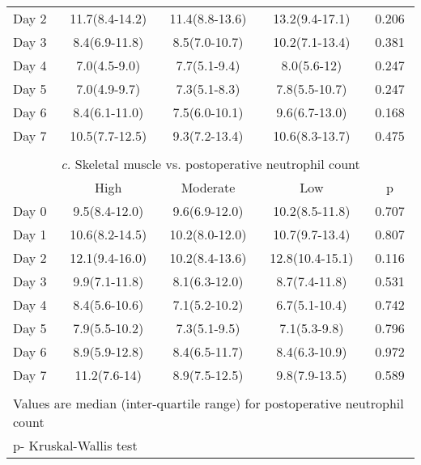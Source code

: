 \begin{table}[p]
\begin{tabular}{|l c c c c |}
		Day 2 & 11.7(8.4-14.2) & 11.4(8.8-13.6)  & 13.2(9.4-17.1)  & 0.206                              \\
		Day 3 & 8.4(6.9-11.8)  & 8.5(7.0-10.7)   & 10.2(7.1-13.4)  & 0.381                              \\
		Day 4 & 7.0(4.5-9.0)   & 7.7(5.1-9.4)    & 8.0(5.6-12)     & 0.247                              \\
		Day 5 & 7.0(4.9-9.7)   & 7.3(5.1-8.3)    & 7.8(5.5-10.7)   & 0.247                              \\
		Day 6 & 8.4(6.1-11.0)    & 7.5(6.0-10.1)   & 9.6(6.7-13.0)   & 0.168                              \\
		Day 7 & 10.5(7.7-12.5) & 9.3(7.2-13.4)   & 10.6(8.3-13.7)  & 0.475                              \\ \hline
		                                     \multicolumn{5}{c}{}                                       \\
		      \multicolumn{5}{c}{\textit{c.} Skeletal muscle vs. postoperative neutrophil count}        \\ \hline
		      & High           & Moderate        & Low             & p                                  \\
		Day 0 & 9.5(8.4-12.0)  & 9.6(6.9-12.0)   & 10.2(8.5-11.8)  & 0.707                              \\
		Day 1 & 10.6(8.2-14.5) & 10.2(8.0-12.0)    & 10.7(9.7-13.4)  & 0.807                              \\
		Day 2 & 12.1(9.4-16.0) & 10.2(8.4-13.6)  & 12.8(10.4-15.1) & 0.116                              \\
		Day 3 & 9.9(7.1-11.8)  & 8.1(6.3-12.0)   & 8.7(7.4-11.8)   & 0.531                              \\
		Day 4 & 8.4(5.6-10.6)  & 7.1(5.2-10.2)   & 6.7(5.1-10.4)   & 0.742                              \\
		Day 5 & 7.9(5.5-10.2)  & 7.3(5.1-9.5)    & 7.1(5.3-9.8)    & 0.796                              \\
		Day 6 & 8.9(5.9-12.8)  & 8.4(6.5-11.7)   & 8.4(6.3-10.9)   & 0.972                              \\
		Day 7 & 11.2(7.6-14)   & 8.9(7.5-12.5)   & 9.8(7.9-13.5)   & 0.589                              \\ \hline
		                                     \multicolumn{5}{c}{}                                       \\
		\multicolumn{5}{l}{Values are median (inter-quartile range) for postoperative neutrophil count} \\
		\multicolumn{5}{l}{p- Kruskal-Wallis test}
	\end{tabular}	
\end{table}






